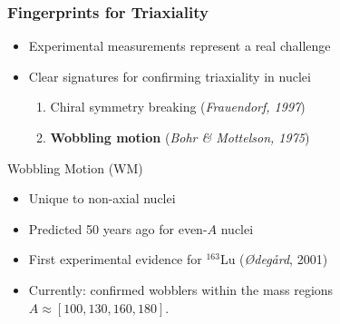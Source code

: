 \documentclass{beamer}
\begin{document}
\begin{frame}
  \frametitle{Fingerprints for Triaxiality}
  \begin{itemize}
    \item Experimental measurements represent a real challenge
    \item Clear signatures for confirming triaxiality in nuclei
    \begin{enumerate}
      \item Chiral symmetry breaking (\textit{Frauendorf, 1997})
      \item \textbf{Wobbling motion} (\textit{Bohr \& Mottelson, 1975})
    \end{enumerate}
  \end{itemize}

  \begin{block}{Wobbling Motion (WM)}
    \begin{itemize}
      \item Unique to non-axial nuclei
      \item Predicted 50 years ago for even-$A$ nuclei
      \item First experimental evidence for $^{163}$Lu (\textit{Ødegård}, 2001)
      \item Currently: confirmed wobblers within the mass regions $A\approx[100,130,160,180]$.
    \end{itemize}
  \end{block}
\end{frame}
\end{document}
